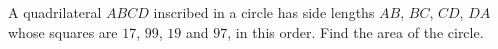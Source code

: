 A quadrilateral $ABCD$ inscribed in a circle has side lengths $AB$, $BC$, $CD$, $DA$ whose squares are $17$, $99$, $19$ and $97$, in this order. Find the area of the circle.
